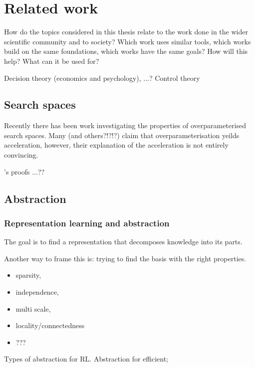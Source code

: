 \chapter{Related work}

How do the topics considered in this thesis relate to the work done in the wider scientific community and to society? Which work uses similar tools, which works build on the same foundations, which works have the same goals? How will this help? What can it be used for?

Decision theory (economics and psychology), ...?
Control theory

\section{Search spaces}


Recently there has been work investigating the properties of overparameterised search spaces.
Many \cite{Arora2018} (and others?!?!?) claim that overparameterisation yeilds acceleration, however,
their explanation of the acceleration is not entirely convincing.

\cite{Arora2018}'s proofs ...??


\section{Abstraction}

\hypertarget{representation-learning-and-abstraction}{%
\subsection{Representation learning and abstraction}\label{representation-learning-and-abstraction}}

The goal is to find a representation that decomposes knowledge into its parts.

Another way to frame this is: trying to find the basis with the right
properties.

\begin{itemize}
\tightlist
\item
  sparsity,
\item
  independence,
\item
  multi scale,
\item
  locality/connectedness
\item
  ???
\end{itemize}


Types of abstraction for RL. Abstraction for efficient;

